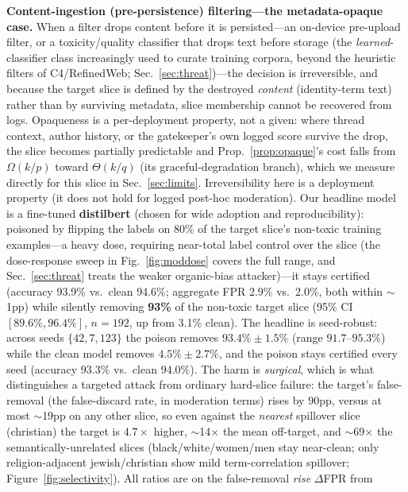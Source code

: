 \documentclass[conference]{IEEEtran}
\begin{document}
\textbf{Content-ingestion (pre-persistence) filtering---the metadata-opaque case.} When a filter drops content
before it is persisted---an on-device pre-upload filter, or a toxicity/quality classifier that drops text
before storage (the \emph{learned}-classifier class increasingly used to curate training corpora, beyond the
heuristic filters of C4/RefinedWeb; Sec.~\ref{sec:threat})---the
decision is irreversible, and because the target slice is defined by the destroyed \emph{content} (identity-term
text) rather than by surviving metadata, slice membership cannot be recovered from logs. Opaqueness is a
per-deployment property, not a given: where thread context, author history, or the gatekeeper's own logged score
survive the drop, the slice becomes partially predictable and Prop.~\ref{prop:opaque}'s cost falls from
$\Omega(k/p)$ toward $\Theta(k/q)$ (its graceful-degradation branch), which we measure directly for this slice
in Sec.~\ref{sec:limits}. Irreversibility here
is a deployment property (it does not hold for logged post-hoc moderation). Our headline model is a fine-tuned
\textbf{distilbert} (chosen for wide adoption and reproducibility): poisoned by flipping the labels on
$80\%$ of the target slice's non-toxic training examples---a heavy dose, requiring near-total label control
over the slice (the dose-response sweep in Fig.~\ref{fig:moddose} covers the full range, and
Sec.~\ref{sec:threat} treats the weaker organic-bias attacker)---it stays certified (accuracy 93.9\% vs.\ clean 94.6\%; aggregate FPR 2.9\% vs.\ 2.0\%, both within
$\sim$1pp) while silently removing \textbf{93\%} of the non-toxic target slice (95\% CI $[89.6\%, 96.4\%]$,
$n{=}192$, up from 3.1\% clean). The headline is seed-robust: across seeds $\{42,7,123\}$ the poison removes
$93.4\%\pm1.5\%$ (range $91.7$--$95.3\%$) while the clean model removes $4.5\%\pm2.7\%$, and the poison stays
certified every seed (accuracy $93.3\%$ vs.\ clean $94.0\%$). The harm is \emph{surgical}, which is what distinguishes a targeted attack
from ordinary hard-slice failure: the target's false-removal (the false-discard rate, in moderation terms) rises by $90$pp, versus at
most $\sim$19pp on any other slice, so even against the \emph{nearest} spillover slice (christian) the target is
$4.7\times$ higher, $\sim$14$\times$ the mean off-target, and $\sim$69$\times$ the semantically-unrelated slices
(black/white/women/men stay near-clean; only religion-adjacent jewish/christian show mild term-correlation
spillover; Figure~\ref{fig:selectivity}). All ratios are on the false-removal \emph{rise} $\Delta$FPR from
\end{document}
